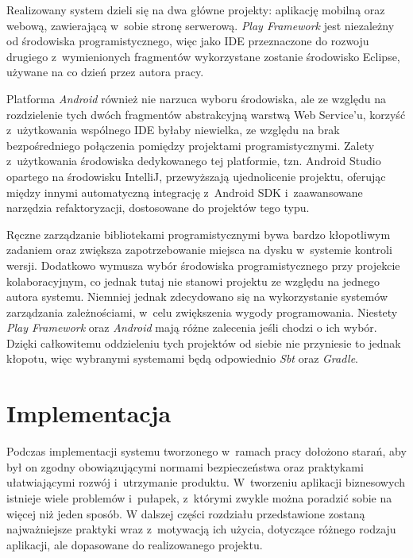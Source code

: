 \documentclass[11pt]{aghdpl}
\begin{document}
Realizowany system dzieli się na dwa główne projekty: aplikację mobilną oraz webową, zawierającą w~sobie stronę serwerową. \emph{Play Framework} jest niezależny od środowiska programistycznego, więc jako IDE przeznaczone do rozwoju drugiego z~wymienionych fragmentów wykorzystane zostanie środowisko Eclipse, używane na co dzień przez autora pracy.

Platforma \emph{Android} również nie narzuca wyboru środowiska, ale ze względu na rozdzielenie tych dwóch fragmentów abstrakcyjną warstwą Web Service'u, korzyść z~użytkowania wspólnego IDE byłaby niewielka, ze względu na brak bezpośredniego połączenia pomiędzy projektami programistycznymi. Zalety z~użytkowania środowiska dedykowanego tej platformie, tzn. Android Studio opartego na środowisku IntelliJ, przewyższają ujednolicenie projektu, oferując między innymi automatyczną integrację z~Android SDK i~zaawansowane narzędzia refaktoryzacji, dostosowane do projektów tego typu.

Ręczne zarządzanie bibliotekami programistycznymi bywa bardzo kłopotliwym zadaniem oraz zwiększa zapotrzebowanie miejsca na dysku w~systemie kontroli wersji. Dodatkowo wymusza wybór środowiska programistycznego przy projekcie kolaboracyjnym, co jednak tutaj nie stanowi projektu ze względu na jednego autora systemu. Niemniej jednak zdecydowano się na wykorzystanie systemów zarządzania zależnościami, w~celu zwiększenia wygody programowania. Niestety \emph{Play Framework} oraz \emph{Android} mają różne zalecenia jeśli chodzi o ich wybór. Dzięki całkowitemu oddzieleniu tych projektów od siebie nie przyniesie to jednak kłopotu, więc wybranymi systemami będą odpowiednio \emph{Sbt} oraz \emph{Gradle}.


\chapter{Implementacja}
\label{cha:implementacja}

Podczas implementacji systemu tworzonego w~ramach pracy dołożono starań, aby był on zgodny obowiązującymi normami bezpieczeństwa oraz praktykami ułatwiającymi rozwój i~utrzymanie produktu. W~tworzeniu aplikacji biznesowych istnieje wiele problemów i~pułapek, z~którymi zwykle można poradzić sobie na więcej niż jeden sposób. W dalszej części rozdziału przedstawione zostaną najważniejsze praktyki wraz z~motywacją ich użycia, dotyczące różnego rodzaju aplikacji, ale dopasowane do realizowanego projektu.
\end{document}
